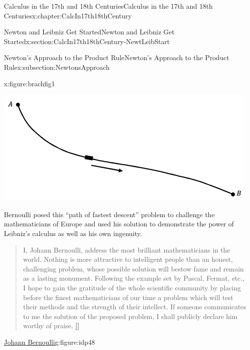 \begin{chapterptx}{Calculus in the 17th and 18th Centuries}{}{Calculus in the 17th and 18th Centuries}{}{}{x:chapter:CalcIn17th18thCentury}
\begin{sectionptx}{Newton and Leibniz Get Started}{}{Newton and Leibniz Get Started}{}{}{x:section:CalcIn17th18thCentury-NewtLeibStart}
\begin{subsectionptx}{Newton's Approach to the Product Rule}{}{Newton's Approach to the Product Rule}{}{}{x:subsection:NewtonsApproach}
\begin{figureptx}{}{x:figure:brachfig1}{}
\begin{image}{0.125}{0.75}{0.125}
					\includegraphics[width=\linewidth]{external/images/brachfig1.png}
				\end{image}%
				\tcblower
			\end{figureptx}%
			Bernoulli posed this ``path of fastest descent'' problem to challenge the mathematicians of Europe and used his solution to demonstrate the power of Leibniz's calculus as well as his own ingenuity.  %
			\begin{quote}%
				I, Johann Bernoulli, address the most brilliant mathematicians in the world. Nothing is more attractive to intelligent people than an honest, challenging problem, whose possible solution will bestow fame and remain as a lasting monument. Following the example set by Pascal, Fermat, etc., I hope to gain the gratitude of the whole scientific community by placing before the finest mathematicians of our time a problem which will test their methods and the strength of their intellect. If someone communicates to me the solution of the proposed problem, I shall publicly declare him worthy of praise. \hyperlink{x:biblio:Bernoulli_bio_mactutor}{[{}]}%
			\end{quote}
			\begin{figureptx}{\href{https://mathshistory.st-andrews.ac.uk/Biographies/Bernoulli_Johann/}{Johann Bernoulli}\protect\footnotemark{}}{g:figure:idp48}{}%
				\begin{image}{0.325}{0.35}{0.325}%

\end{image}
\end{figureptx}
\end{subsectionptx}
\end{sectionptx}
\end{chapterptx}
